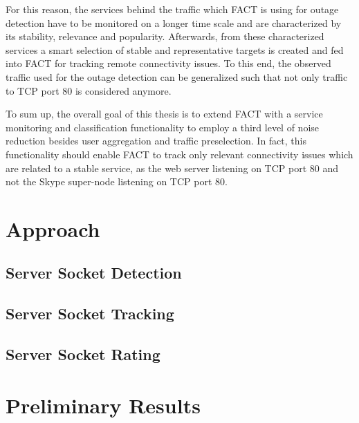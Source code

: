 \documentclass{sigcomm-alternate}
\begin{document}
For this reason, the services behind the traffic which FACT is using for outage detection have to be monitored on a longer time scale and are characterized by its stability, relevance and popularity. Afterwards, from these characterized services a smart selection of stable and representative targets is created and fed into FACT for tracking remote connectivity issues. To this end, the observed traffic used for the outage detection can be generalized such that not only traffic to TCP port 80 is considered anymore. 

To sum up, the overall goal of this thesis is to extend FACT with a service monitoring and classification functionality to employ a third level of noise reduction besides user aggregation and traffic preselection. In fact, this functionality should enable FACT to track only relevant connectivity issues which are related to a stable service, as the web server listening on TCP port 80 and not the Skype super-node listening on TCP port 80.

\section{Approach}

\subsection{Server Socket Detection}

\subsection{Server Socket Tracking}

\subsection{Server Socket Rating}


\section{Preliminary Results}



 
% 

\end{document}

